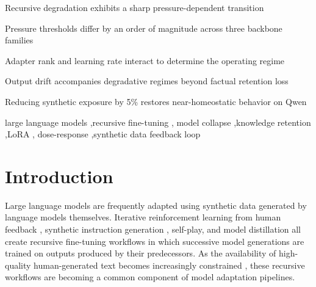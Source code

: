 \documentclass[a4paper,fleqn]{cas-dc}
\begin{document}
\begin{highlights}
\item Recursive degradation exhibits a sharp pressure-dependent transition
\item Pressure thresholds differ by an order of magnitude across three backbone families
\item Adapter rank and learning rate interact to determine the operating regime
\item Output drift accompanies degradative regimes beyond factual retention loss
\item Reducing synthetic exposure by 5\% restores near-homeostatic behavior on Qwen
\end{highlights}

\begin{keywords}
large language models \sep recursive fine-tuning \sep
model collapse \sep knowledge retention \sep LoRA \sep
dose-response \sep synthetic data feedback loop
\end{keywords}

\maketitle

\section{Introduction}\label{sec:introduction}

Large language models are frequently adapted using synthetic data generated by
language models themselves. Iterative reinforcement learning from human feedback
\citep{ouyang2022training}, synthetic instruction generation
\citep{wang2023selfinstruct,taori2023alpaca}, self-play, and model distillation
all create recursive fine-tuning workflows in which successive model generations
are trained on outputs produced by their predecessors. As the availability of high-quality
human-generated text becomes increasingly constrained \citep{villalobos2024},
these recursive workflows are becoming a common component of model adaptation
pipelines.
\end{document}

